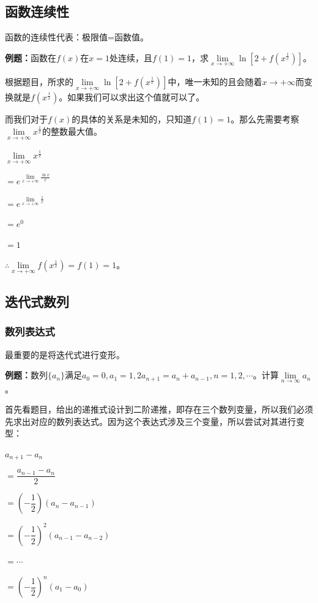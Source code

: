 \subsection{函数连续性}

函数的连续性代表：极限值=函数值。

\textbf{例题：}函数在$f(x)$在$x=1$处连续，且$f(1)=1$，求$\lim\limits_{x\to+\infty}\ln\left[2+f\left(x^{\frac{1}{x}}\right)\right]$。

根据题目，所求的$\lim\limits_{x\to+\infty}\ln\left[2+f\left(x^{\frac{1}{x}}\right)\right]$中，唯一未知的且会随着$x\to+\infty$而变换就是$f\left(x^{\frac{1}{x}}\right)$。如果我们可以求出这个值就可以了。

而我们对于$f(x)$的具体的关系是未知的，只知道$f(1)=1$。那么先需要考察$\lim\limits_{x\to+\infty}x^{\frac{1}{x}}$的整数最大值。

$\lim\limits_{x\to+\infty}x^{\frac{1}{x}}$

$=e^{\lim\limits_{x\to+\infty}\frac{\ln x}{x}}$

$=e^{\lim\limits_{x\to+\infty}\frac{1}{x}}$

$=e^0$

$=1$

$\therefore\lim\limits_{x\to+\infty}f(x^{\frac{1}{x}})=f(1)=1$。

\subsection{迭代式数列}

\subsubsection{数列表达式}

最重要的是将迭代式进行变形。

\textbf{例题：}数列$\{a_n\}$满足$a_0=0,a_1=1,2a_{n+1}=a_n+a_{n-1},n=1,2,\cdots$。计算$\lim\limits_{n\to\infty}a_n$。

首先看题目，给出的递推式设计到二阶递推，即存在三个数列变量，所以我们必须先求出对应的数列表达式。因为这个表达式涉及三个变量，所以尝试对其进行变型：

$a_{n+1}-a_n$

$=\dfrac{a_{n-1}-a_n}{2}$

$=\left(-\dfrac{1}{2}\right)(a_n-a_{n-1})$

$=\left(-\dfrac{1}{2}\right)^2(a_{n-1}-a_{n-2})$

$=\cdots$

$=\left(-\dfrac{1}{2}\right)^n(a_1-a_0)$

